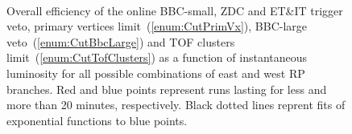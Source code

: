 \begin{figure}[h]
{\begin{subfigure}[b]{\linewidth}
  \end{subfigure}
}%
\quad\quad%
\parbox{0.4725\textwidth}{
  \centering
  \begin{subfigure}[b]{\linewidth}\addtocounter{subfigure}{-2}
  \end{subfigure}\\
  \begin{subfigure}[b]{\linewidth}\addtocounter{subfigure}{1}
  \end{subfigure}
}%
\caption[Overall efficiency of online and offlince cuts as a function of instantaneous luminosity.]{Overall efficiency of the online BBC-small, ZDC and ET\&IT trigger veto, primary vertices limit~(\ref{enum:CutPrimVx}), BBC-large veto~(\ref{enum:CutBbcLarge}) and TOF clusters limit~(\ref{enum:CutTofClusters}) as a function of instantaneous luminosity for all possible combinations of east and west RP branches. Red and blue points represent runs lasting for less and more than 20 minutes, respectively. Black dotted lines reprent fits of exponential functions to blue points.}\label{fig:onlineAndOfflineVetoEff}%
\end{figure}



